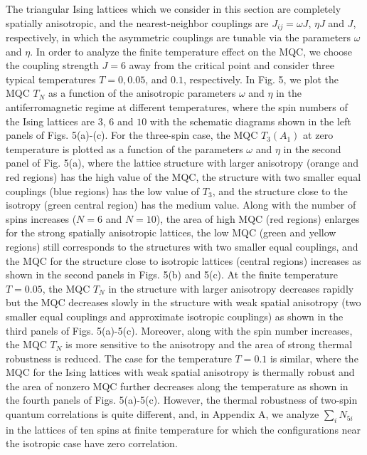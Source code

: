 \documentclass[pra,aps,twocolumn,showpacs]{revtex4}
\begin{document}
The triangular Ising lattices which we consider in this section are completely spatially anisotropic, and the nearest-neighbor couplings are $J_{ij}=\omega J$, $\eta J$ and $J$, respectively, in which the asymmetric couplings are tunable via the parameters $\omega$ and $\eta$. In order to analyze the finite temperature effect on the MQC, we choose the coupling strength $J=6$ away from the critical point and consider three typical temperatures $T=0, 0.05$, and $0.1$, respectively. In Fig. 5, we plot the MQC $T_N$ as a function of the anisotropic parameters $\omega$ and $\eta$  in the antiferromagnetic regime at different temperatures, where the spin numbers of the Ising lattices are $3$, $6$ and $10$ with the schematic diagrams shown in the left panels of Figs. 5(a)-(c). For the three-spin case, the MQC $T_3(A_1)$ at zero temperature is plotted as a function of the parameters $\omega$ and $\eta$ in the second panel of Fig. 5(a), where the lattice structure with larger anisotropy (orange and red regions) has the high value of the MQC, the structure with two smaller equal couplings (blue regions) has the low value of $T_3$, and the structure close to the isotropy (green central region) has the medium value. Along with the number of spins increases ($N=6$ and $N=10$), the area of high MQC (red regions) enlarges for the strong spatially anisotropic lattices, the low MQC (green and yellow regions) still corresponds to the structures with two smaller equal couplings, and the MQC for the structure close to isotropic lattices (central regions) increases as shown in the second panels in Figs. 5(b) and 5(c). At the finite temperature $T=0.05$, the MQC $T_N$ in the structure with larger anisotropy decreases rapidly but the MQC decreases slowly in the structure with weak spatial anisotropy (two smaller equal couplings and approximate isotropic couplings) as shown in the third panels of Figs. 5(a)-5(c). Moreover, along with the spin number increases, the MQC $T_N$ is more sensitive to the anisotropy and the area of strong thermal robustness is reduced. The case for the temperature $T=0.1$ is similar, where the MQC for the Ising lattices with weak spatial anisotropy is thermally robust and the area of nonzero MQC further decreases along the temperature as shown in the fourth panels of Figs. 5(a)-5(c). However, the thermal robustness of two-spin quantum correlations is quite different, and, in Appendix A, we analyze $\sum_i N_{5i}$ in the lattices of ten spins at finite temperature for which the configurations near the isotropic case have zero correlation.
\end{document}
